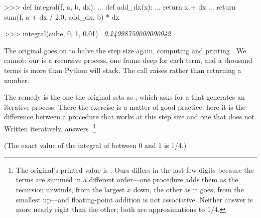 \begin{codeBlock}
>>> def integral(f, a, b, dx):
...     def add_dx(x):
...         return x + dx
...     return sum(f, a + dx / 2.0, add_dx, b) * dx

>>> integral(cube, 0, 1, 0.01)
~\textit{0.24998750000000042}~
\end{codeBlock}

\begin{departure}
The original goes on to halve the step size again, computing
 and printing .  We
cannot: our  is a recursive process, one frame deep for each term,
and a thousand terms is more than Python will stack.  The call raises
 rather than returning a number.

The remedy is the one the original sets as , which asks
for a  that generates an iterative process.  There the exercise is a
matter of good practice; here it is the difference between a procedure that
works at this step size and one that does not.  Written iteratively,
 answers
.\footnote{The original's printed value is
.  Ours differs in the last few digits because the
terms are summed in a different order---one procedure adds them as the
recursion unwinds, from the largest \( x \) down, the other as it goes, from
the smallest up---and floating-point addition is not associative.  Neither
answer is more nearly right than the other; both are approximations to
\( 1/4 \).}
\end{departure}

\noindent
(The exact value of the integral of  between 0 and 1 is 1/4.)

